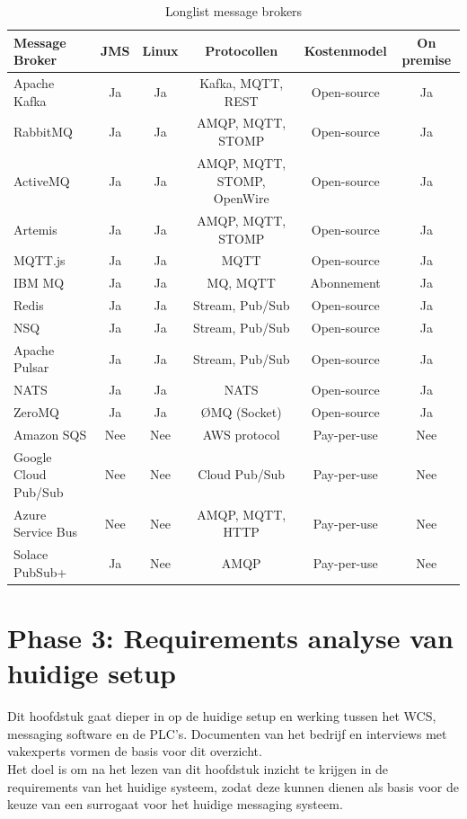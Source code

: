 \begin{table}[!ht]
\footnotesize
\centering
\begin{tabular}{|l|c|c|c|c|c|}
\hline
Message Broker & JMS & Linux & Protocollen & Kostenmodel & On premise \\
\hline
Apache Kafka & Ja & Ja & Kafka, MQTT, REST & Open-source & Ja \\
\hline
RabbitMQ & Ja & Ja & AMQP, MQTT, STOMP & Open-source & Ja \\
\hline
ActiveMQ & Ja & Ja & AMQP, MQTT, STOMP, OpenWire & Open-source & Ja \\ 
\hline
Artemis & Ja & Ja & AMQP, MQTT, STOMP & Open-source & Ja \\
\hline
MQTT.js & Ja & Ja & MQTT & Open-source & Ja \\
\hline
IBM MQ & Ja & Ja & MQ, MQTT & Abonnement & Ja \\
\hline
Redis & Ja & Ja & Stream, Pub/Sub & Open-source & Ja \\
\hline
NSQ & Ja & Ja & Stream, Pub/Sub & Open-source & Ja \\
\hline
Apache Pulsar & Ja & Ja & Stream, Pub/Sub & Open-source & Ja \\
\hline
NATS & Ja & Ja & NATS & Open-source & Ja \\
\hline
ZeroMQ & Ja & Ja & ØMQ (Socket) & Open-source & Ja \\ 
\hline
Amazon SQS & Nee & Nee & AWS protocol & Pay-per-use & Nee \\
\hline
Google Cloud Pub/Sub & Nee & Nee & Cloud Pub/Sub & Pay-per-use & Nee \\
\hline
Azure Service Bus & Nee & Nee & AMQP, MQTT, HTTP & Pay-per-use & Nee \\
\hline
Solace PubSub+ & Ja & Nee & AMQP & Pay-per-use & Nee \\
\hline
\end{tabular}
\caption{\label{tab:message_brokers}Longlist message brokers}
\end{table}

\section{Phase 3: Requirements analyse van huidige setup}
Dit hoofdstuk gaat dieper in op de huidige setup en werking tussen het WCS, messaging software en de PLC's.
Documenten van het bedrijf en interviews met vakexperts vormen de basis voor dit overzicht.
\\
Het doel is om na het lezen van dit hoofdstuk inzicht te krijgen in de requirements van het huidige systeem, 
zodat deze kunnen dienen als basis voor de keuze van een surrogaat voor het huidige messaging systeem.


